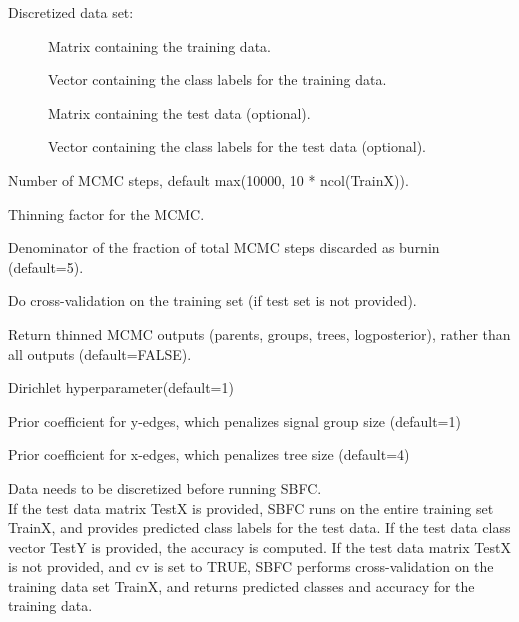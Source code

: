 \documentclass[a4paper]{book}
\begin{document}
\begin{Arguments}
\begin{ldescription}
\item[\code{data}] Discretized data set:
\begin{description}
     
\item[] Matrix containing the training data.
\item[] Vector containing the class labels for the training data.
\item[] Matrix containing the test data (optional).
\item[] Vector containing the class labels for the test data (optional).

\end{description}


\item[\code{nstep}] Number of MCMC steps, default max(10000, 10 * ncol(TrainX)).

\item[\code{thin}] Thinning factor for the MCMC.

\item[\code{burnin\_denom}] Denominator of the fraction of total MCMC steps discarded as burnin (default=5).

\item[\code{cv}] Do cross-validation on the training set (if test set is not provided).

\item[\code{thinoutputs}] Return thinned MCMC outputs (parents, groups, trees, logposterior), rather than all outputs (default=FALSE).

\item[\code{alpha}] Dirichlet hyperparameter(default=1)

\item[\code{y\_penalty}] Prior coefficient for y-edges, which penalizes signal group size (default=1)

\item[\code{x\_penalty}] Prior coefficient for x-edges, which penalizes tree size (default=4)
\end{ldescription}
\end{Arguments}
%
\begin{Details}\relax
Data needs to be discretized before running SBFC. \\{}
If the test data matrix TestX is provided, SBFC runs on the entire training set TrainX, and provides predicted class labels for the test data. 
If the test data class vector TestY is provided, the accuracy is computed. 
If the test data matrix TestX is not provided, and cv is set to TRUE, SBFC performs cross-validation on the training data set TrainX, 
and returns predicted classes and accuracy for the training data. \\{}
\end{Details}
\end{document}
